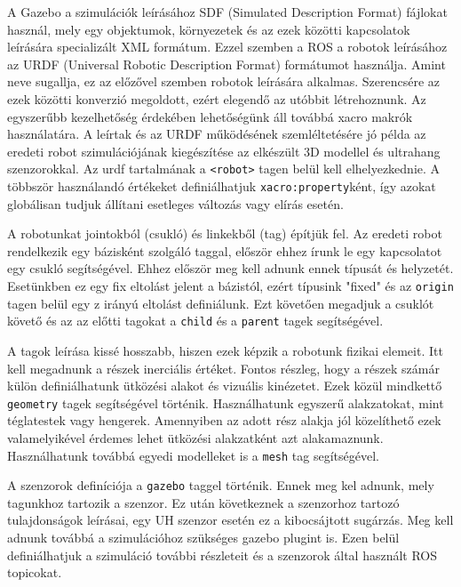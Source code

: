 A Gazebo a szimulációk leírásához SDF (Simulated Description Format) fájlokat használ, mely egy objektumok, környezetek és az ezek közötti kapcsolatok leírására specializált XML formátum. Ezzel szemben a ROS a robotok leírásához az URDF (Universal Robotic Description Format) formátumot használja. Amint neve sugallja, ez az előzővel szemben robotok leírására alkalmas. Szerencsére az ezek közötti konverzió megoldott, ezért elegendő az utóbbit létrehoznunk. Az egyszerűbb kezelhetőség érdekében lehetőségünk áll továbbá xacro makrók használatára. A leírtak és az URDF működésének szemléltetésére jó példa az eredeti robot szimulációjának kiegészítése az elkészült 3D modellel és ultrahang szenzorokkal. Az urdf tartalmának a \lstinline{<robot>} tagen belül kell elhelyezkednie. A többször használandó értékeket definiálhatjuk \lstinline{xacro:property}ként, így azokat globálisan tudjuk állítani esetleges változás vagy elírás esetén. 

A robotunkat jointokból (csukló) és linkekből (tag) építjük fel. Az eredeti robot rendelkezik egy bázisként szolgáló taggal, először ehhez írunk le egy kapcsolatot egy csukló segítségével. Ehhez először meg kell adnunk ennek típusát és helyzetét. Esetünkben ez egy fix eltolást jelent a bázistól, ezért típusink "fixed" és az \lstinline{origin} tagen belül egy z irányú eltolást definiálunk. Ezt követően megadjuk a csuklót követő és az az előtti tagokat a \lstinline{child} és a \lstinline{parent} tagek segítségével.

A tagok leírása kissé hosszabb, hiszen ezek képzik a robotunk fizikai elemeit. Itt kell megadnunk a részek inerciális értéket. Fontos részleg, hogy a részek számár külön definiálhatunk ütközési alakot és vizuális kinézetet. Ezek közül mindkettő \lstinline{geometry} tagek segítségével történik. Használhatunk egyszerű alakzatokat, mint téglatestek vagy hengerek. Amennyiben az adott rész alakja jól közelíthető ezek valamelyikével érdemes lehet ütközési alakzatként azt alakamaznunk. Használhatunk továbbá egyedi modelleket is a \lstinline{mesh} tag segítségével.

A szenzorok definíciója a \lstinline{gazebo} taggel történik. Ennek meg kel adnunk, mely tagunkhoz tartozik a szenzor. Ez után következnek a szenzorhoz tartozó tulajdonságok leírásai, egy UH szenzor esetén ez a kibocsájtott sugárzás. Meg kell adnunk továbbá a szimulációhoz szükséges gazebo plugint is. Ezen belül definiálhatjuk a szimuláció további részleteit és a szenzorok által használt ROS topicokat.
